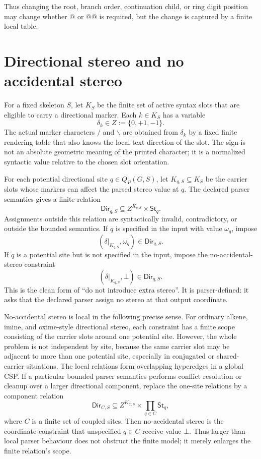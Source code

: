 \documentclass[10pt,a4paper]{article}
\newcommand{\None}{\bot}
\newcommand{\Dir}{\mathsf{Dir}}
\newcommand{\St}{\mathsf{St}}
\theoremstyle{definition}
\theoremstyle{remark}
\begin{document}
	Thus changing the root, branch order, continuation child, or ring digit position
	may change whether \(@\) or \(@@\) is required, but the change is captured by a
	finite local table.

	\section{Directional stereo and no accidental stereo}
	\label{s:directional}

	For a fixed skeleton \(S\), let \(K_S\) be the finite set of active syntax slots
	that are eligible to carry a directional marker.  Each \(k\in K_S\) has a
	variable
	\[
	\delta_k\in Z:=\{0,+1,-1\}.
	\]
	The actual marker characters \(\mathtt{/}\) and \(\backslash\) are obtained from \(\delta_k\) by
	a fixed finite rendering table that also knows the local text direction of the
	slot.  The sign is not an absolute geometric meaning of the printed character;
	it is a normalized syntactic value relative to the chosen slot orientation.

	For each potential directional site \(q\in Q_P(G,S)\), let
	\(K_{q,S}\subseteq K_S\) be the carrier slots whose markers can affect the parsed
	stereo value at \(q\).  The declared parser semantics gives a finite relation
	\[
	\Dir_{q,S}
	\subseteq
	Z^{K_{q,S}}\times \St_q .
	\]
	Assignments outside this relation are syntactically invalid, contradictory, or
	outside the bounded semantics.  If \(q\) is specified in the input with value
	\(\omega_q\), impose
	\[
	(\delta|_{K_{q,S}},\omega_q)\in\Dir_{q,S} .
	\]
	If \(q\) is a potential site but is not specified in the input, impose the
	no-accidental-stereo constraint
	\[
	(\delta|_{K_{q,S}},\None)\in\Dir_{q,S} .
	\]
	This is the clean form of ``do not introduce extra stereo''.  It is parser-defined:
	it asks that the declared parser assign no stereo at that output coordinate.

	No-accidental stereo is local in the following precise sense.  For ordinary
	alkene, imine, and oxime-style directional stereo, each constraint has a finite
	scope consisting of the carrier slots around one potential site.  However, the
	whole problem is not independent by site, because the same carrier slot may be
	adjacent to more than one potential site, especially in conjugated or
	shared-carrier situations.  The local relations form overlapping hyperedges in a
	global CSP.  If a particular bounded parser semantics performs conflict
	resolution or cleanup over a larger directional component, replace the one-site
	relations by a component relation
	\[
	\Dir_{C,S}
	\subseteq
	Z^{K_{C,S}}\times \prod_{q\in C}\St_q,
	\]
	where \(C\) is a finite set of coupled sites.  Then no-accidental stereo is the
	coordinate constraint that unspecified \(q\in C\) receive value \(\None\).  Thus
	larger-than-local parser behaviour does not obstruct the finite model; it merely
	enlarges the finite relation's scope.
\end{document}
